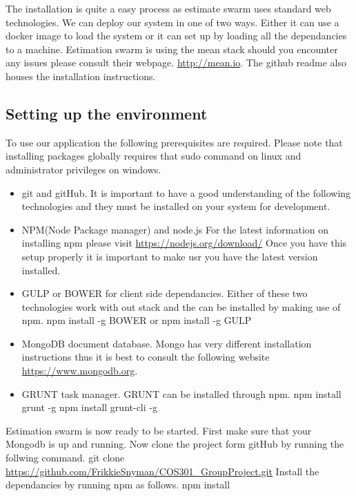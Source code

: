 The installation is quite a easy process as estimate swarm uses standard web technologies. We can deploy our system in one of two ways. Either it can use a docker image to load the system or it can set up by loading all the dependancies to a machine. Estimation swarm is using the mean stack should you encounter any issues please consult their webpage. \url{http://mean.io}. The github readme also houses the installation instructions.
\subsection{Setting up the environment}
To use our application the following prerequisites are required. Please note that installing packages globally requires that sudo command on linux and administrator privileges on windows.
\begin{itemize}
	\item git and gitHub. It is important to have a good understanding of the following technologies and they must be installed on your system for development.
	\item NPM(Node Package manager) and node.js 
	For the latest information on installing npm please visit \url{https://nodejs.org/download/} Once you have this setup properly it is important to make usr you have the latest version installed.
	\item GULP or BOWER for client side dependancies.
	Either of these two technologies work with out stack and the can be installed by making use of npm.
	\newline
	npm install -g BOWER or npm install -g GULP 
	\item MongoDB document database. Mongo has very different installation instructions thus it is best to consult the following website \url{https://www.mongodb.org}.
	\item GRUNT task manager. GRUNT can be installed through npm. 
	\newline
	npm install grunt -g
	\newline
	npm install grunt-cli -g
\end{itemize}
Estimation swarm is now ready to be started. First make sure that your Mongodb is up and running. Now clone the project form gitHub by running the follwing command.
\newline
git clone \url{https://github.com/FrikkieSnyman/COS301_GroupProject.git}
\newline
Install the dependancies by running npm as follows.
\newline
npm install
